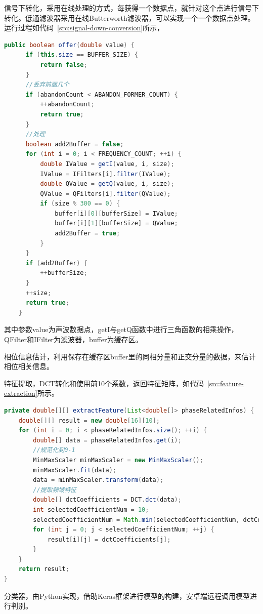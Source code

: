 信号下转化，采用在线处理的方式，每获得一个数据点，就针对这个点进行信号下转化。低通滤波器采用在线Butterworth滤波器，可以实现一个一个数据点处理。运行过程如代码~\ref{src:signal-down-conversion}所示，
\begin{lstlisting}[language={Java}, caption={实时信号下转化 \label{src:signal-down-conversion}} ]
public boolean offer(double value) {
      if (this.size == BUFFER_SIZE) {
          return false;
      }
      //丢弃前面几个
      if (abandonCount < ABANDON_FORMER_COUNT) {
          ++abandonCount;
          return true;
      }
      //处理
      boolean add2Buffer = false;
      for (int i = 0; i < FREQUENCY_COUNT; ++i) {
          double IValue = getI(value, i, size);
          IValue = IFilters[i].filter(IValue);
          double QValue = getQ(value, i, size);
          QValue = QFilters[i].filter(QValue);
          if (size % 300 == 0) {
              buffer[i][0][bufferSize] = IValue;
              buffer[i][1][bufferSize] = QValue;
              add2Buffer = true;
          }
      }
      if (add2Buffer) {
          ++bufferSize;
      }
      ++size;
      return true;
    }
\end{lstlisting}
其中参数value为声波数据点，getI与getQ函数中进行三角函数的相乘操作，QFilter和IFilter为滤波器，buffer为缓存区。

相位信息估计，利用保存在缓存区buffer里的同相分量和正交分量的数据，来估计相位相关信息。

特征提取，DCT转化和使用前10个系数，返回特征矩阵，如代码~\ref{src:feature-extraction}所示。
\begin{minipage}{\linewidth}
\begin{lstlisting}[language={Java}, caption={特征提取 \label{src:feature-extraction}}]
private double[][] extractFeature(List<double[]> phaseRelatedInfos) {
    double[][] result = new double[16][10];
    for (int i = 0; i < phaseRelatedInfos.size(); ++i) {
        double[] data = phaseRelatedInfos.get(i);
        //规范化到0-1
        MinMaxScaler minMaxScaler = new MinMaxScaler();
        minMaxScaler.fit(data);
        data = minMaxScaler.transform(data);
        //提取频域特征
        double[] dctCoefficients = DCT.dct(data);
        int selectedCoefficientNum = 10;
        selectedCoefficientNum = Math.min(selectedCoefficientNum, dctCoefficients.length);
        for (int j = 0; j < selectedCoefficientNum; ++j) {
            result[i][j] = dctCoefficients[j];
        }
    }
    return result;
}
\end{lstlisting}
\end{minipage}
分类器，由Python实现，借助Keras框架进行模型的构建，安卓端远程调用模型进行判别。


